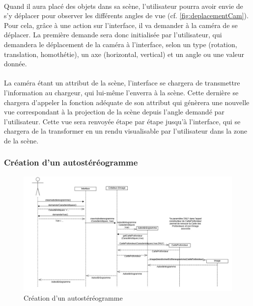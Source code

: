 \paragraph{}
Quand il aura placé des objets dans sa scène, l’utilisateur pourra avoir envie de s’y déplacer pour observer les différents angles de vue (cf. \ref{fig:deplacementCam}). Pour cela, grâce à une action sur l’interface, il va demander à la caméra de se déplacer. La première demande sera donc initialisée par l’utilisateur, qui demandera le déplacement de la caméra à l’interface, selon un type (rotation, translation, homothétie), un axe (horizontal, vertical) et un angle ou une valeur donnée.

\paragraph{}
La caméra étant un attribut de la scène, l’interface se chargera de transmettre l’information au chargeur, qui lui-même l’enverra à la scène. Cette dernière se chargera d'appeler la fonction adéquate de son attribut qui génèrera une nouvelle vue correspondant à la projection de la scène depuis l’angle demandé par l’utilisateur. Cette vue sera renvoyée étape par étape jusqu’à l’interface, qui se chargera de la transformer en un rendu visualisable par l’utilisateur dans la zone de la scène.

\subsubsection{Création d'un autostéréogramme}

\begin{figure}[h]
		\centering
		\includegraphics[scale=0.3]{creerstereogramme.jpg}
		\caption{\label{fig:creerAutostereogramme} Création d'un autostéréogramme}
\end{figure}

